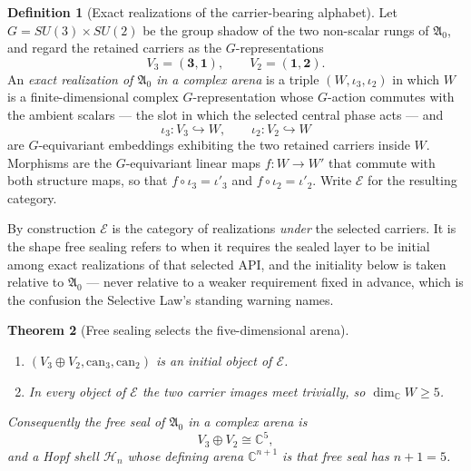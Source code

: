 \documentclass[11pt]{article}
\theoremstyle{plain}
\newtheorem{theorem}{Theorem}[section]
\theoremstyle{definition}
\newtheorem{definition}[theorem]{Definition}
\theoremstyle{remark}
\newcommand{\C}{\mathbb{C}}
\begin{document}
\begin{definition}[Exact realizations of the carrier-bearing alphabet]
Let \(G=SU(3)\times SU(2)\) be the group shadow of the two non-scalar rungs of
\(\mathfrak A_0\), and regard the retained carriers as the \(G\)-representations
\[
V_3=(\mathbf3,\mathbf1),
\qquad
V_2=(\mathbf1,\mathbf2).
\]
An \emph{exact realization of \(\mathfrak A_0\) in a complex arena} is a triple
\((W,\iota_3,\iota_2)\) in which \(W\) is a finite-dimensional complex
\(G\)-representation whose \(G\)-action commutes with the ambient scalars --- the
slot in which the selected central phase acts --- and
\[
\iota_3:V_3\hookrightarrow W,
\qquad
\iota_2:V_2\hookrightarrow W
\]
are \(G\)-equivariant embeddings exhibiting the two retained carriers inside
\(W\).  Morphisms are the \(G\)-equivariant linear maps \(f:W\to W'\) that
commute with both structure maps, so that \(f\circ\iota_3=\iota'_3\) and
\(f\circ\iota_2=\iota'_2\).  Write \(\mathcal E\) for the resulting category.

By construction \(\mathcal E\) is the category of realizations \emph{under} the
selected carriers.  It is the shape free sealing refers to when it requires the
sealed layer to be initial among exact realizations of that selected API, and
the initiality below is taken relative to \(\mathfrak A_0\) --- never relative
to a weaker requirement fixed in advance, which is the confusion the Selective
Law's standing warning names.
\end{definition}

\begin{theorem}[Free sealing selects the five-dimensional arena]
\begin{enumerate}[label=\textup{(\roman*)},leftmargin=2.2em,itemsep=0pt]
\item \((V_3\oplus V_2,\mathrm{can}_3,\mathrm{can}_2)\) is an initial object of
\(\mathcal E\).
\item In every object of \(\mathcal E\) the two carrier images meet trivially,
so \(\dim_\C W\ge5\).
\end{enumerate}
Consequently the free seal of \(\mathfrak A_0\) in a complex arena is
\[
V_3\oplus V_2\cong\C^5 ,
\]
and a Hopf shell \(\mathcal H_n\) whose defining arena \(\C^{n+1}\) is that free
seal has \(n+1=5\).
\end{theorem}
\end{document}
